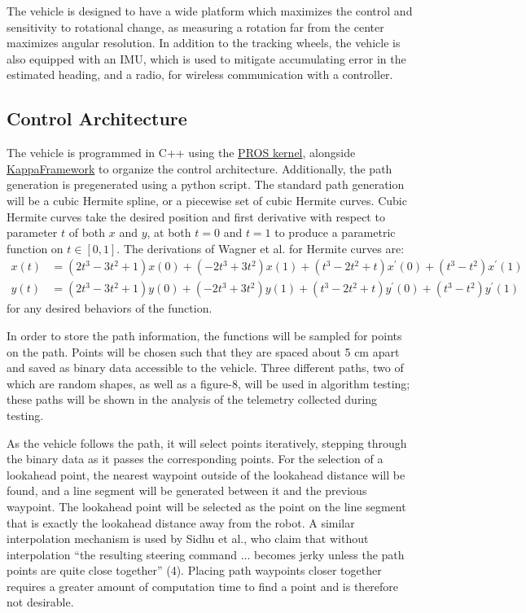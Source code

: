 \documentclass[12pt]{article}
\begin{document}
\begin{flushleft}
The vehicle is designed to have a wide platform which maximizes the control and sensitivity to rotational change, as measuring a rotation far from the center maximizes angular resolution. In addition to the tracking wheels, the vehicle is also equipped with an IMU, which is used to mitigate accumulating error in the estimated heading, and a radio, for wireless communication with a controller.

\subsection{Control Architecture}

The vehicle is programmed in C++ using the \href{https://github.com/purduesigbots/pros}{PROS kernel}, alongside \href{https://github.com/SpencerJ21/KappaFramework}{KappaFramework} to organize the control architecture. Additionally, the path generation is pregenerated using a python script. The standard path generation will be a cubic Hermite spline, or a piecewise set of cubic Hermite curves. Cubic Hermite curves take the desired position and first derivative with respect to parameter $t$ of both $x$ and $y$, at both $t=0$ and $t=1$ to produce a parametric function on $t\in[0,1]$. The derivations of Wagner et al. for Hermite curves are:
\begin{subequations}
\begin{align}
x(t)&=(2t^3-3t^2+1)x(0)+(-2t^3+3t^2)x(1)+(t^3-2t^2+t)x^\prime(0)+(t^3-t^2)x^\prime(1) \\
y(t)&=(2t^3-3t^2+1)y(0)+(-2t^3+3t^2)y(1)+(t^3-2t^2+t)y^\prime(0)+(t^3-t^2)y^\prime(1)
\end{align}
\end{subequations}
for any desired behaviors of the function.

In order to store the path information, the functions will be sampled for points on the path. Points will be chosen such that they are spaced about 5 cm apart and saved as binary data accessible to the vehicle. Three different paths, two of which are random shapes, as well as a figure-8, will be used in algorithm testing; these paths will be shown in the analysis of the telemetry collected during testing.

As the vehicle follows the path, it will select points iteratively, stepping through the binary data as it passes the corresponding points. For the selection of a lookahead point, the nearest waypoint outside of the lookahead distance will be found, and a line segment will be generated between it and the previous waypoint. The lookahead point will be selected as the point on the line segment that is exactly the lookahead distance away from the robot. A similar interpolation mechanism is used by Sidhu et al., who claim that without interpolation ``the resulting steering command ... becomes jerky unless the path points are quite close together'' (4). Placing path waypoints closer together requires a greater amount of computation time to find a point and is therefore not desirable. 


\end{flushleft}
\end{document}
